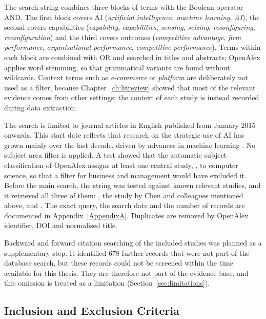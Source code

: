 The search string combines three blocks of terms with the Boolean operator AND. The first block covers AI (\textit{artificial intelligence}, \textit{machine learning}, \textit{AI}), the second covers capabilities (\textit{capability}, \textit{capabilities}, \textit{sensing}, \textit{seizing}, \textit{reconfiguring}, \textit{reconfiguration}) and the third covers outcomes (\textit{competitive advantage}, \textit{firm performance}, \textit{organisational performance}, \textit{competitive performance}). Terms within each block are combined with OR and searched in titles and abstracts; OpenAlex applies word stemming, so that grammatical variants are found without wildcards. Context terms such as \textit{e-commerce} or \textit{platform} are deliberately not used as a filter, because Chapter~\ref{ch:litreview} showed that most of the relevant evidence comes from other settings; the context of each study is instead recorded during data extraction.

The search is limited to journal articles in English published from January 2015 onwards. This start date reflects that research on the strategic use of AI has grown mainly over the last decade, driven by advances in machine learning \parencite{borges2021}. No subject-area filter is applied. A test showed that the automatic subject classification of OpenAlex assigns at least one central study, \textcite{chen2022}, to computer science, so that a filter for business and management would have excluded it. Before the main search, the string was tested against known relevant studies, and it retrieved all three of them: \textcite{mikalef2021ai}, the study by Chen and colleagues mentioned above, and \textcite{shao2026}. The exact query, the search date and the number of records are documented in Appendix~\ref{AppendixA}. Duplicates are removed by OpenAlex identifier, DOI and normalised title.

Backward and forward citation searching of the included studies was planned as a supplementary step. It identified 678 further records that were not part of the database search, but these records could not be screened within the time available for this thesis. They are therefore not part of the evidence base, and this omission is treated as a limitation (Section~\ref{sec:limitations}).

\subsection{Inclusion and Exclusion Criteria}
\label{sec:criteria}

